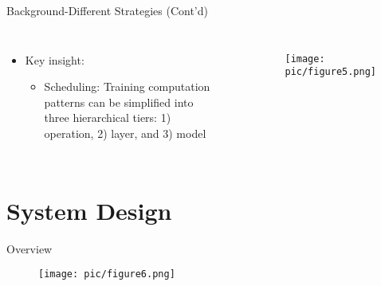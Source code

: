 \documentclass{beamer}
\begin{document}
\begin{frame}{Background-Different Strategies (Cont'd)}
\begin{columns}
	\begin{itemize}
		\item {Key insight:  
		}
            \begin{itemize}
                \item Scheduling: Training computation patterns can be simplified into three hierarchical tiers: 1) operation, 2) layer, and 3) model
            \end{itemize}
	\end{itemize}\
	\begin{figure}
		\centering
		\texttt{[image: pic/figure5.png]}
		\label{secert_sharing_figures}
	\end{figure}
\end{columns}
\end{frame}


\section{System Design}
\begin{frame}{Overview}
	\begin{figure}
		\centering
		\texttt{[image: pic/figure6.png]}
		\label{secert_sharing_figures}
	\end{figure}
\end{frame}
\end{document}
